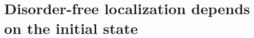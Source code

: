 \providecommand{\sxb}[1]{\sigma^{x}_{b_{#1}}}
\providecommand{\szb}[1]{\sigma^{z}_{b_{#1}}}
\providecommand{\cdr}{\tilde c}
\providecommand{\LinkS}{\mathcal{S}}
\providecommand{\Edim}{\E_{\mathrm{dim}}}
\providecommand{\mudim}{\mu_{\mathrm{dim}}}
\providecommand{\Psidim}{\Psi^{\mathrm{dim}}}
\providecommand{\chidim}{\chi^{\mathrm{dim}}}
\providecommand{\Omdim}{\Omega^{\mathrm{dim}}}
\providecommand{\ncdw}{n^{\mathrm{cdw}}}
\providecommand{\Tdim}{\mathcal{T}}
\providecommand{\Mom}{\mathcal{M}}
\providecommand{\Rot}{\mathrm{Rot}}
\providecommand{\gdim}{\mathsf{g}}
\providecommand{\Cov}{\operatorname{Cov}}

\section{Disorder-free localization depends on the initial state}\label{sec:dimer}

